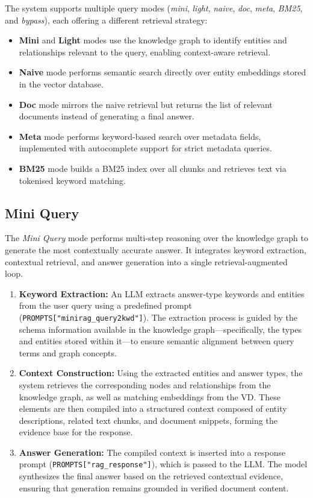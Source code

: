 The system supports multiple query modes (\textit{mini}, \textit{light}, \textit{naive}, \textit{doc}, \textit{meta}, \textit{BM25}, and \textit{bypass}), each offering a different retrieval strategy:
\begin{itemize}
    \item \textbf{Mini} and \textbf{Light} modes use the knowledge graph to identify entities and relationships relevant to the query, enabling context-aware retrieval.
    \item \textbf{Naive} mode performs semantic search directly over entity embeddings stored in the vector database.
    \item \textbf{Doc} mode mirrors the naive retrieval but returns the list of relevant documents instead of generating a final answer.
    \item \textbf{Meta} mode performs keyword-based search over metadata fields, implemented with autocomplete support for strict metadata queries.
    \item \textbf{BM25} mode builds a BM25 index over all chunks and retrieves text via tokenised keyword matching.
\end{itemize}
\subsection{Mini Query}

The \textit{Mini Query} mode performs multi-step reasoning over the knowledge graph to generate the most contextually accurate answer.  
It integrates keyword extraction, contextual retrieval, and answer generation into a single retrieval-augmented loop.

\begin{enumerate}
    \item \textbf{Keyword Extraction:}  
    An \ac{LLM} extracts answer-type keywords and entities from the user query using a predefined prompt (\texttt{PROMPTS["minirag\_query2kwd"]}).  
    The extraction process is guided by the schema information available in the knowledge graph—specifically, the types and entities stored within it—to ensure semantic alignment between query terms and graph concepts.
    
    \item \textbf{Context Construction:}  
    Using the extracted entities and answer types, the system retrieves the corresponding nodes and relationships from the knowledge graph, as well as matching embeddings from the \ac{VD}.  
    These elements are then compiled into a structured context composed of entity descriptions, related text chunks, and document snippets, forming the evidence base for the response.
    
    \item \textbf{Answer Generation:}  
    The compiled context is inserted into a response prompt (\texttt{PROMPTS["rag\_response"]}), which is passed to the \ac{LLM}.  
    The model synthesizes the final answer based on the retrieved contextual evidence, ensuring that generation remains grounded in verified document content.
\end{enumerate}

